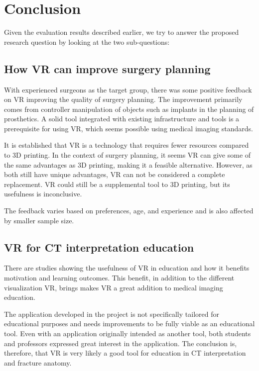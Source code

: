 \documentclass[a4paper]{report}
\begin{document}
\chapter{Conclusion}
Given the evaluation results described earlier, we try to answer the proposed research question by looking at the two sub-questions:

\section{How VR can improve surgery planning}

With experienced surgeons as the target group, there was some positive feedback on VR improving the quality of surgery planning. The improvement primarily comes from controller manipulation of objects such as implants in the planning of prosthetics.
A solid tool integrated with existing infrastructure and tools is a prerequisite for using VR, which seems possible using medical imaging standards.

It is established that VR is a technology that requires fewer resources compared to 3D printing. In the context of surgery planning, it seems VR can give some of the same advantages as 3D printing, making it a feasible alternative. However, as both still have unique advantages, VR can not be considered a complete replacement. VR could still be a supplemental tool to 3D printing, but its usefulness is inconclusive.

The feedback varies based on preferences, age, and experience and is also affected by smaller sample size.

\section{VR for CT interpretation education}
There are studies showing the usefulness of VR in education and how it benefits motivation and learning outcomes. This benefit, in addition to the different visualization VR, brings makes VR a great addition to medical imaging education.

The application developed in the project is not specifically tailored for educational purposes and needs improvements to be fully viable as an educational tool.
Even with an application originally intended as another tool, both students and professors expressed great interest in the application. The conclusion is, therefore, that VR is very likely a good tool for education in CT interpretation and fracture anatomy.
\end{document}

